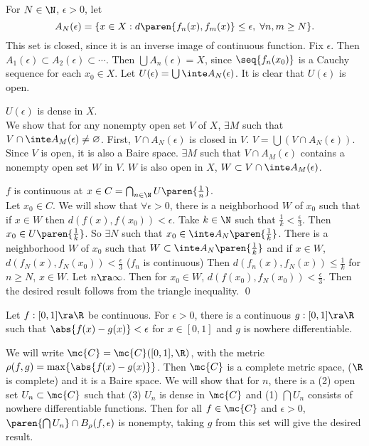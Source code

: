 \pf For \(N \in \N\), \(\epsilon > 0\), let
\[
    A_N(\epsilon) = \{x \in X : d\paren{f_n(x), f_m(x)} \leq \epsilon,\; \forall n, m \geq N\}.
\]
This set is closed, since it is an inverse image of continuous function. Fix \(\epsilon\). Then \(A_1(\epsilon) \subset A_2(\epsilon) \subset \cdots\). Then \(\bigcup A_n(\epsilon) = X\), since \(\seq{f_n(x_0)}\) is a Cauchy sequence for each \(x_0 \in X\). Let \(U(\epsilon) = \bigcup \inte A_N(\epsilon)\). It is clear that \(U(\epsilon)\) is open.

 \(U(\epsilon)\) is dense in \(X\). \\
We show that for any nonempty open set \(V\) of \(X\), \(\exists M\) such that \(V \cap \inte A_M(\epsilon) \neq \varnothing\). First, \(V \cap A_N(\epsilon)\) is closed in \(V\). \(V = \bigcup (V \cap A_N(\epsilon))\). Since \(V\) is open, it is also a Baire space. \(\exists M\) such that \(V \cap A_M(\epsilon)\) contains a nonempty open set \(W\) in \(V\). \(W\) is also open in \(X\), \(W \subset V \cap \inte A_M(\epsilon)\).

 \(f\) is continuous at \(x \in C = \bigcap_{n \in \N} U\paren{\frac{1}{n}}\). \\
Let \(x_0 \in C\). We will show that \(\forall \epsilon > 0\), there is a neighborhood \(W\) of \(x_0\) such that if \(x \in W\) then \(d(f(x), f(x_0)) < \epsilon\). Take \(k \in \N\) such that \(\frac{1}{k} < \frac{\epsilon}{3}\). Then \(x_0 \in U\paren{\frac{1}{k}}\). So \(\exists N\) such that \(x_0 \in \inte A_N\paren{\frac{1}{k}}\). There is a neighborhood \(W\) of \(x_0\) such that \(W \subset \inte A_N\paren{\frac{1}{k}}\) and if \(x \in W\), \(d(f_N(x), f_N(x_0)) < \frac{\epsilon}{3}\) (\(f_n\) is continuous) Then \(d(f_n(x), f_N(x)) \leq \frac{1}{k}\) for \(n \geq N\), \(x \in W\). Let \(n\ra\infty\). Then for \(x_0 \in W\), \(d(f(x_0), f_N(x_0)) < \frac{\epsilon}{3}\). Then the desired result follows from the triangle inequality. \qed


 Let \(f : [0, 1] \ra \R\) be continuous. For \(\epsilon > 0\), there is a continuous \(g: [0, 1] \ra \R\) such that \(\abs{f(x) - g(x)} < \epsilon\) for \(x \in [0, 1]\) and \(g\) is nowhere differentiable.

\pf We will write \(\mc{C} = \mc{C}([0, 1], \R)\), with the metric \(\rho(f, g) = \max\{\abs{f(x) - g(x)}\}\). Then \(\mc{C}\) is a complete metric space, (\(\R\) is complete) and it is a Baire space. We will show that for \(n\), there is a (2) open set \(U_n \subset \mc{C}\) such that (3) \(U_n\) is dense in \(\mc{C}\) and (1) \(\bigcap U_n\) consists of nowhere differentiable functions. Then for all \(f \in \mc{C}\) and \(\epsilon > 0\), \(\paren{\bigcap U_n} \cap B_\rho(f, \epsilon)\) is nonempty, taking \(g\) from this set will give the desired result.

